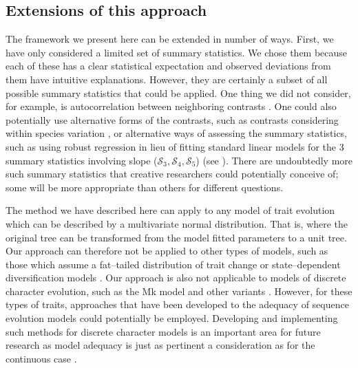 \documentclass[a4paper,12pt]{article}
\begin{document}
\subsection*{Extensions of this approach}
The framework we present here can be extended in number of ways. First, we have only considered a limited set of summary statistics. We chose them because each of these has a clear statistical expectation and observed deviations from them have intuitive explanations. However, they are certainly a subset of all possible summary statistics that could be applied. One thing we did not consider, for example, is autocorrelation between neighboring contrasts \citep{Gittleman1990}. One could also potentially use alternative forms of the contrasts, such as contrasts considering within species variation \citep{Felsenstein2008}, or alternative ways of assessing the summary statistics, such as using robust regression in lieu of fitting standard linear models for the 3 summary statistics involving slope ($\mathcal{S}_3, \mathcal{S}_4, \mathcal{S}_5$) (see \citep{SlaterPennell}). There are undoubtedly more such summary statistics that creative researchers could potentially conceive of; some will be more appropriate than others for different questions.

The method we have described here can apply to any model of trait evolution which can be described by a multivariate normal distribution. That is, where the original tree can be transformed from the model fitted parameters to a unit tree. Our approach can therefore not be applied to other types of models, such as those which assume a fat--tailed distribution of trait change \citep{Landis2012} or state--dependent diversification models \citep{Bokma2008, FitzJohn2010}. Our approach is also not applicable to models of discrete character evolution, such as the Mk model \citep{Pagel1994} and other variants \citep{Felsenstein2012, Beaulieu2013}. However, for these types of traits, approaches that have been developed to the adequacy of sequence evolution models \citep{Bollback2002, Lewis2013} could potentially be employed. Developing and implementing such methods for discrete character models is an important area for future research as model adequacy is just as pertinent a consideration as for the continuous case \citep{ReadNee1995}. 
\end{document}
